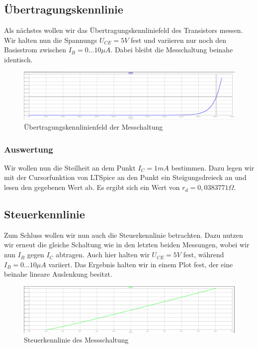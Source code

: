 \documentclass{article}
\begin{document}
\subsection{Übertragungskennlinie}
\label{sec:ubertr}

Als nächstes wollen wir das Übertragungskennliniefeld des Transistors messen. Wir halten nun die Spannungs $U_{CE} = 5V$ fest und variieren nur noch den Basisstrom zwischen $I_{B} = 0...10\mu A$. Dabei bleibt die Messchaltung beinahe identisch.

\begin{figure}[h]
  \centering
  \includegraphics[width=\textwidth]{../assets/images/EL1P3/uebertragungskennlinie.png}
  \caption{Übertragungskennlinienfeld der Messchaltung}
  \label{fig:uebertragungskennlinie}
\end{figure}

\subsubsection{Auswertung}

Wir wollen nun die Steilheit an dem Punkt $I_{C} = 1mA$ bestimmen. Dazu legen wir mit der Cursorfunktion von LTSpice an den Punkt ein Steigungsdreieck an und lesen den gegebenen Wert ab. Es ergibt sich ein Wert von $r_{d} = 0,0383771\Omega$.

\newpage

\subsection{Steuerkennlinie}
\label{sec:steuerkennlinie}

Zum Schluss wollen wir nun auch die Steuerkennlinie betrachten. Dazu nutzen wir erneut die gleiche Schaltung wie in den letzten beiden Messungen, wobei wir nun $I_{B}$ gegen $I_{C}$ abtragen. Auch hier halten wir $U_{CE} = 5V$ fest, während $I_{B} = 0...10\mu A$ variiert. Das Ergebnis halten wir in einem Plot fest, der eine beinahe lineare Auslenkung besitzt.

\begin{figure}[h]
  \centering
  \includegraphics[width=\textwidth]{../assets/images/EL1P3/steuerkennlinie.png}
  \caption{Steuerkennlinie des Messschaltung}
  \label{fig:steuer}
\end{figure}
\newpage
\end{document}
